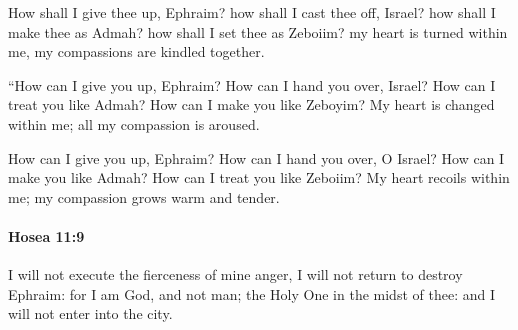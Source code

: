 			\begin{versebox}
					\item[BHS] 
					\item[LXX] 
					\item[ASV] How shall I give thee up, Ephraim? how shall I cast thee off, Israel? how shall I make thee as Admah? how shall I set thee as Zeboiim? my heart is turned within me, my compassions are kindled together.
					\item[NIV] “How can I give you up, Ephraim? How can I hand you over, Israel? How can I treat you like Admah? How can I make you like Zeboyim? My heart is changed within me; all my compassion is aroused.
					\item[NRSV] How can I give you up, Ephraim? How can I hand you over, O Israel? How can I make you like Admah? How can I treat you like Zeboiim? My heart recoils within me; my compassion grows warm and tender.
			\end{versebox}

		\paragraph{Hosea 11:9} %
			\label{HOSEA-11-9}

			I will not execute the fierceness of mine anger, I will not return to destroy Ephraim: for I am God, and not man; the Holy One in the midst of thee: and I will not enter into the city.

